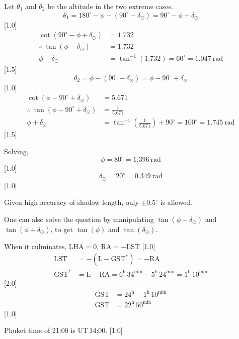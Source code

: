 Let $\theta_1$ and $\theta_2$ be the altitude in the two extreme cases.
\[ \theta_1 = 180^\circ - \phi - (90^\circ - \delta_\odot)
   = 90^\circ - \phi + \delta_\odot \]
\hfill[1.0]
\begin{align*}
\cot(90^\circ - \phi + \delta_\odot) &= 1.732\\
\therefore\ \tan(\phi - \delta_\odot) &= 1.732\\
\phi - \delta_\odot &= \tan^{-1}(1.732) = 60^\circ = 1.047\ \mathrm{rad}
\end{align*}
\hfill[1.5]
\[ \theta_2 = \phi - (90^\circ - \delta_\odot)
   = \phi - 90^\circ + \delta_\odot \]
\hfill[1.0]
\begin{align*}
\cot(\phi - 90^\circ + \delta_\odot) &= 5.671\\
\therefore\ \tan(\phi - 90^\circ + \delta_\odot) &= \frac{1}{5.671}\\
\phi + \delta_\odot &= \tan^{-1}\left(\frac{1}{5.671}\right) + 90^\circ
  = 100^\circ = 1.745\ \mathrm{rad}
\end{align*}
\hfill[1.5]

Solving,
\[ \boxed{\phi = 80^\circ} = 1.396\ \mathrm{rad} \]
\hfill[1.0]
\[ \boxed{\delta_\odot = 20^\circ} = 0.349\ \mathrm{rad} \]
\hfill[1.0]

Given high accuracy of shadow length, only $\pm 0.5^\circ$ is allowed.

One can also solve the question by manipulating $\tan(\phi - \delta_\odot)$
and $\tan(\phi + \delta_\odot)$, to get $\tan(\phi)$ and $\tan(\delta_\odot)$.

When it culminates, $\mathrm{LHA} = 0$,
$\mathrm{RA} = -\mathrm{LST}$ \hfill[1.0]
\begin{align*}
\mathrm{LST} &= -(\mathrm{L} - \mathrm{GST}^{*}) = -\mathrm{RA}\\
\mathrm{GST}^{*} &= \mathrm{L} - \mathrm{RA}
  = 6^{\mathrm{h}}\,34^{\mathrm{min}} - 5^{\mathrm{h}}\,24^{\mathrm{min}}
  = 1^{\mathrm{h}}\,10^{\mathrm{min}}
\end{align*}
\hfill[2.0]
\begin{align*}
\mathrm{GST} &= 24^{\mathrm{h}} - 1^{\mathrm{h}}\,10^{\mathrm{min}}\\
\mathrm{GST} &= 22^{\mathrm{h}}\,50^{\mathrm{min}}
\end{align*}
\hfill[1.0]

Phuket time of 21:00 is UT\,14:00. \hfill[1.0]

